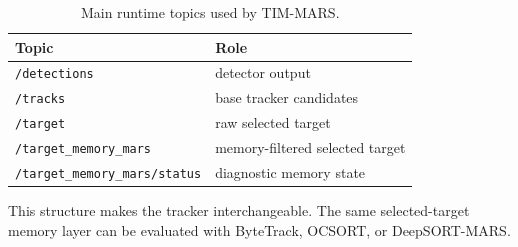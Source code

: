 \begin{table}[t]
\centering
\caption{Main runtime topics used by TIM-MARS.}
\label{tab:topics}
\begin{tabular}{ll}
\toprule
Topic & Role \\
\midrule
\texttt{/detections} & detector output \\
\texttt{/tracks} & base tracker candidates \\
\texttt{/target} & raw selected target \\
\texttt{/target\_memory\_mars} & memory-filtered selected target \\
\texttt{/target\_memory\_mars/status} & diagnostic memory state \\
\bottomrule
\end{tabular}
\end{table}

This structure makes the tracker interchangeable. The same selected-target memory layer can be evaluated with ByteTrack, OCSORT, or DeepSORT-MARS.
